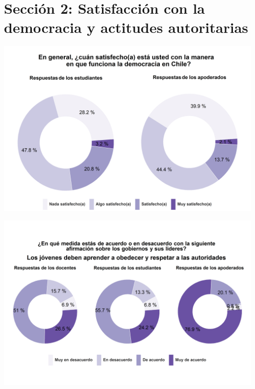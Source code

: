 \documentclass[
  14pt,
]{book}
\begin{document}
\hypertarget{secciuxf3n-2-satisfacciuxf3n-con-la-democracia-y-actitudes-autoritarias}{%
\section{Sección 2: Satisfacción con la democracia y actitudes autoritarias}\label{secciuxf3n-2-satisfacciuxf3n-con-la-democracia-y-actitudes-autoritarias}}

\begin{center}\includegraphics[width=52.49in]{images/graph_dem} \end{center}

\begin{center}\includegraphics[width=52.49in]{images/graph_aut1} \end{center}
\end{document}
